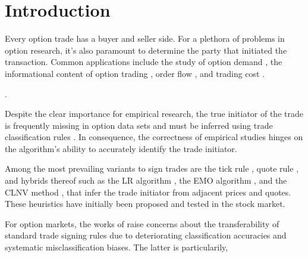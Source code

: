 \section{Introduction}\label{sec:introduction}

Every option trade has a buyer and seller side. For a plethora of problems in option research, it’s also paramount to determine the party that initiated the transaction. Common applications include the study of option demand \autocite[][3]{garleanuDemandBasedOptionPricing2009}, the informational content of option trading \autocites[][631]{huDoesOptionTrading2014}[][882]{panInformationOptionVolume2006}, order flow \autocite[][684]{muravyevOrderFlowExpected2016}, and trading cost \autocite[][4980]{muravyevOptionsTradingCosts2020}. 

.

Despite the clear importance for empirical research, the true initiator of the trade is frequently missing in option data sets and must be inferred using trade classification rules \autocite[][453]{easleyOptionVolumeStock1998}. In consequence, the correctness of empirical studies hinges on the algorithm's ability to accurately identify the trade initiator.

Among the most prevailing variants to sign trades are the tick rule \autocite[][240]{hasbrouckTradesQuotesInventories1988}, quote rule \autocite[][41]{harrisDayEndTransactionPrice1989}, and hybrids thereof such as the \gls{LR} algorithm \autocite[][745]{leeInferringTradeDirection1991}, the \gls{EMO} algorithm \autocite[][536]{ellisAccuracyTradeClassification2000}, and the \gls{CLNV} method \autocite[][3809]{chakrabartyTradeClassificationAlgorithms2007}, that infer the trade initiator from adjacent prices and quotes. These heuristics have initially been proposed and tested in the stock market.

For option markets, the works of \textcites[][10--13]{grauerOptionTradeClassification2022}[][887]{savickasInferringDirectionOption2003} raise concerns about the transferability of standard trade signing rules due to deteriorating classification accuracies and systematic misclassification biases. The latter is particularily,  


